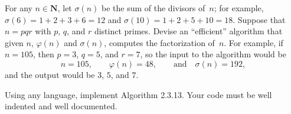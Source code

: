 \documentclass{exam}
\newcommand{\N}{\mathbb{N}}
\newcommand{\con}{\equiv}
\newcommand{\vphi}{\varphi}
\renewcommand{\mathbb}{\mathbf}
\begin{document}
\begin{questions}

\question[15]\label{ex:crack3}
   For any $n\in\N$, let $\sigma(n)$ be the
  sum of the divisors of~$n$; for example, $\sigma(6) = 1+2+3+6=12$ and
  $\sigma(10)=1+2+5+10=18$.
  Suppose that $n=pqr$ with $p$, $q$, and $r$ distinct primes.  Devise
  an ``efficient'' algorithm that given $n$, $\vphi(n)$ and
  $\sigma(n)$, computes the factorization of~$n$.  For example, if
  $n=105$, then $p=3$, $q=5$, and $r=7$, so the input to the algorithm
  would be
  $$
    n = 105,\qquad \vphi(n) = 48, \qquad \text{and}\quad \sigma(n)=192,
  $$
  and the output would be $3$, $5$, and $7$.





\question[15] Using any language, implement Algorithm 2.3.13. Your code must be well indented and well documented.


\end{questions}
\end{document}
